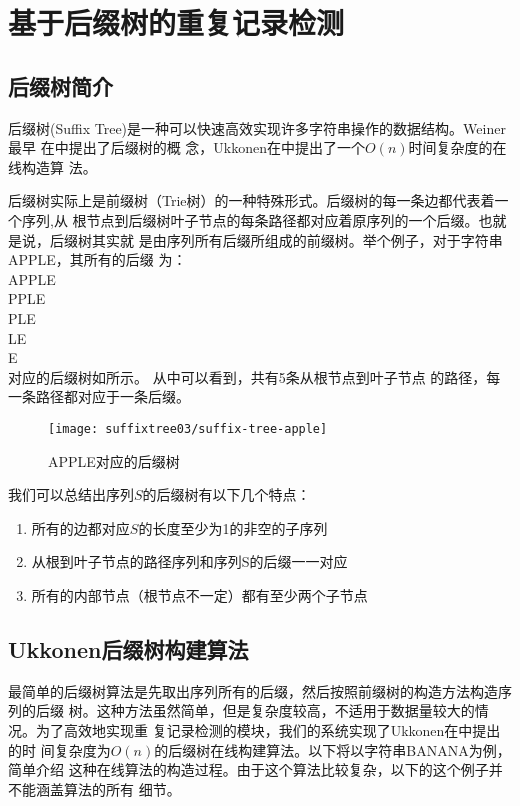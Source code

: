 
\chapter{基于后缀树的重复记录检测}
\label{chap:suffixtree}

\section{后缀树简介}
\label{sec:suffixtreeintro}
后缀树(Suffix Tree)是一种可以快速高效实现许多字符串操作的数据结构。Weiner最早
在\cite{weiner1973linear}中提出了后缀树的概
念，Ukkonen在\cite{ukkonen1995line}中提出了一个$O(n)$时间复杂度的在线构造算
法。

后缀树实际上是前缀树（Trie树）的一种特殊形式。后缀树的每一条边都代表着一个序列,从
根节点到后缀树叶子节点的每条路径都对应着原序列的一个后缀。也就是说，后缀树其实就
是由序列所有后缀所组成的前缀树。举个例子，对于字符串{APPLE}，其所有的后缀
为：\\
APPLE\\
PPLE\\
PLE\\
LE\\
E\\
对应的后缀树如所示。
从中可以看到，共有5条从根节点到叶子节点
的路径，每一条路径都对应于一条后缀。
\begin{figure}[h]
  \centering
  \texttt{[image: suffixtree03/suffix-tree-apple]}
  \caption{APPLE对应的后缀树}
  \label{suffixtree:fig:suffix-tree-apple}
\end{figure}

我们可以总结出序列$S$的后缀树有以下几个特点：
\begin{enumerate}
\item 所有的边都对应$S$的长度至少为1的非空的子序列
\item 从根到叶子节点的路径序列和序列S的后缀一一对应
\item 所有的内部节点（根节点不一定）都有至少两个子节点
\end{enumerate}

\section{Ukkonen后缀树构建算法}
\label{sec:ukkonen}
最简单的后缀树算法是先取出序列所有的后缀，然后按照前缀树的构造方法构造序列的后缀
树。这种方法虽然简单，但是复杂度较高，不适用于数据量较大的情况。为了高效地实现重
复记录检测的模块，我们的系统实现了Ukkonen在\cite{ukkonen1995line}中提出的时
间复杂度为$O(n)$的后缀树在线构建算法。以下将以字符串{BANANA}为例，简单介绍
这种在线算法的构造过程。由于这个算法比较复杂，以下的这个例子并不能涵盖算法的所有
细节。

